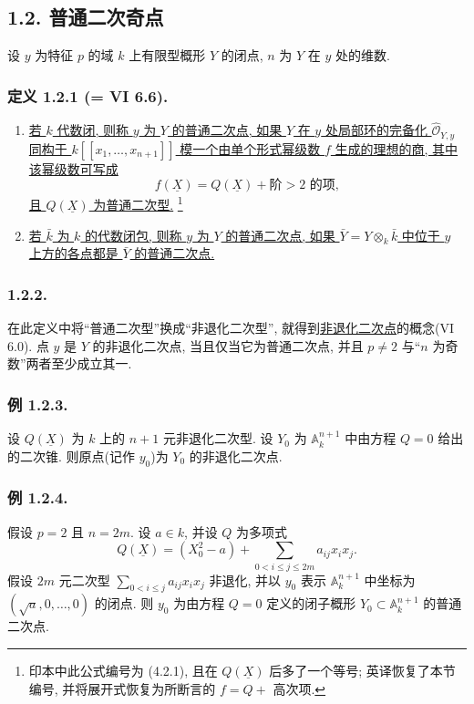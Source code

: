 \subsection*{1.2. 普通二次奇点}

设 $y$ 为特征 $p$ 的域 $k$ 上有限型概形 $Y$ 的闭点, $n$ 为 $Y$ 在 $y$ 处的维数.

\subsubsection*{定义 1.2.1 (= VI 6.6).}
\begin{enumerate}[label=(\roman*),leftmargin=2.6em]
\item \underline{若 $k$ 代数闭, 则称 $y$ 为 $Y$ 的普通二次点, 如果 $Y$ 在 $y$ 处局部环的完备化 $\widehat{\mathcal O}_{Y,y}$ 同构于 $k[[x_1,\ldots,x_{n+1}]]$ 模一个由单个形式幂级数 $f$ 生成的理想的商, 其中该幂级数可写成}
\begin{equation}\tag{1.2.1.1}
f(\underline X)=Q(\underline X)+\text{阶}>2\text{ 的项},
\end{equation}
\underline{且 $Q(\underline X)$ 为普通二次型.}
\footnote{印本中此公式编号为 (4.2.1), 且在 $Q(\underline X)$ 后多了一个等号; 英译恢复了本节编号, 并将展开式恢复为所断言的 $f=Q+$ 高次项.}

\item \underline{若 $\bar k$ 为 $k$ 的代数闭包, 则称 $y$ 为 $Y$ 的普通二次点, 如果 $\bar Y=Y\otimes_k\bar k$ 中位于 $y$ 上方的各点都是 $\bar Y$ 的普通二次点.}
\end{enumerate}

\subsubsection*{1.2.2.}
在此定义中将“普通二次型”换成“非退化二次型”, 就得到\underline{非退化二次点}的概念(VI 6.0). 点 $y$ 是 $Y$ 的非退化二次点, 当且仅当它为普通二次点, 并且 $p\ne2$ 与“$n$ 为奇数”两者至少成立其一.

\subsubsection*{例 1.2.3.}
设 $Q(\underline X)$ 为 $k$ 上的 $n+1$ 元非退化二次型. 设 $Y_0$ 为 $\mathbb A_k^{n+1}$ 中由方程 $Q=0$ 给出的二次锥. 则原点(记作 $y_0$)为 $Y_0$ 的非退化二次点.

\subsubsection*{例 1.2.4.}
假设 $p=2$ 且 $n=2m$. 设 $a\in k$, 并设 $Q$ 为多项式
\[
Q(\underline X)=(X_0^2-a)
 +\sum_{0<i\leq j\leq2m}a_{ij}x_ix_j.
\]
假设 $2m$ 元二次型 $\sum_{0<i\leq j}a_{ij}x_ix_j$ 非退化, 并以 $y_0$ 表示 $\mathbb A_k^{n+1}$ 中坐标为 $(\sqrt a,0,\ldots,0)$ 的闭点. 则 $y_0$ 为由方程 $Q=0$ 定义的闭子概形 $Y_0\subset\mathbb A_k^{n+1}$ 的普通二次点.

